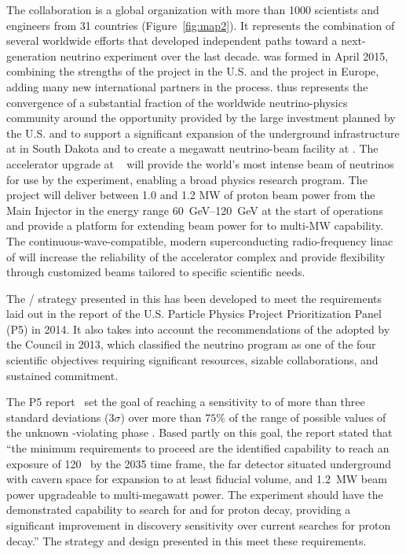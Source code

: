 The  collaboration is a global organization with more than \num{1000} scientists and engineers from \num{31} countries (Figure~\ref{fig:map2}). It represents the combination of several worldwide efforts that developed independent paths toward a next-generation  neutrino experiment over the last decade.  was formed in April 2015, combining the strengths of the  project in the U.S. and the  project in Europe, adding many new international partners in the process.  thus represents the convergence of a substantial fraction of the worldwide neutrino-physics community around the opportunity provided by the large investment planned by the U.S.  and  to support a significant expansion of the underground infrastructure at  in South Dakota and to create a megawatt neutrino-beam facility at . 
The  accelerator upgrade at ~\cite{pip2-2013} will provide the world's most intense beam of neutrinos for use by the %
 experiment, enabling a broad physics research program.  
The  project will deliver between 1.0 and 1.2 MW of proton beam power from the  Main Injector in the energy range \SIrange{60}{120}{\GeV} at the start of  operations and provide a platform for extending beam power for  to multi-MW capability. %
The continuous-wave-compatible, modern superconducting radio-frequency linac of  will increase the reliability of the  accelerator complex and provide flexibility through customized  beams tailored to specific scientific needs.  

The / strategy presented in this  has been developed to meet the requirements laid out in the report of the U.S. Particle Physics Project Prioritization Panel (P5) in 2014. It also takes into account the recommendations of the  adopted by the  Council in 2013, which classified the  neutrino program as one of the four scientific objectives requiring significant resources, sizable collaborations, and sustained commitment.


The P5 report~\cite{p5report} set the goal of reaching a sensitivity to  of more than three standard deviations (\num{3}$\sigma$) over more than $75\%$ 
of the range of possible values of the unknown -violating phase \deltacp.
Based partly on this goal, the report stated that ``the 
minimum requirements to proceed are the identified capability to reach an exposure 
of \num{120}~\ktMWyr{} by the 2035 time frame, the far detector situated underground 
with cavern space for expansion to at least \fdfiducialmass {} fiducial volume, and \SI{1.2}{MW} beam power upgradeable to multi-megawatt power.
The experiment should have the demonstrated 
capability to search for  and for proton decay, providing a significant 
improvement in discovery sensitivity over current searches for proton decay.'' The strategy and design presented in this  meet these requirements.

